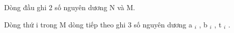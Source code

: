 Dòng đầu ghi 2 số nguyên dương N và M.

Dòng thứ i trong M dòng tiếp theo ghi 3 số nguyên dương a $_ i $ , b $_ i $ , t $_ i $ .